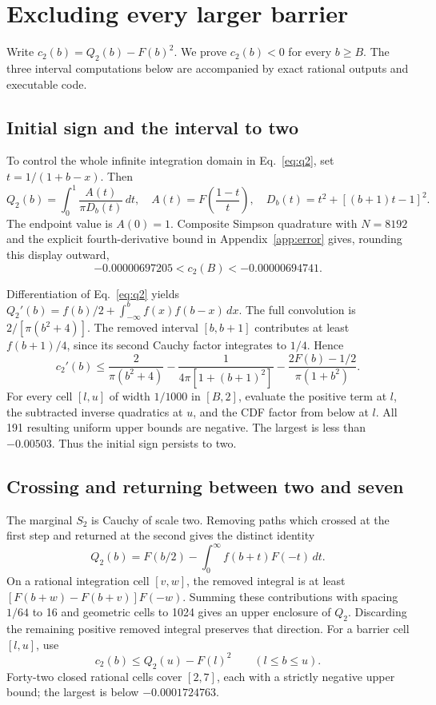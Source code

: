 \documentclass[11pt]{article}
\begin{document}
\section{Excluding every larger barrier}
Write $c_2(b)=Q_2(b)-F(b)^2$. We prove $c_2(b)<0$ for every $b\ge B$.
The three interval computations below are accompanied by exact rational
outputs and executable code.

\subsection{Initial sign and the interval to two}
To control the whole infinite integration domain in Eq.~\eqref{eq:q2}, set
$t=1/(1+b-x)$. Then
\begin{equation}\label{eq:compact}
 Q_2(b)=\int_0^1\frac{A(t)}{\pi D_b(t)}\,dt,\quad
 A(t)=F\left(\frac{1-t}{t}\right),\quad
 D_b(t)=t^2+[(b+1)t-1]^2.
\end{equation}
The endpoint value is $A(0)=1$. Composite Simpson quadrature with $N=8192$
and the explicit fourth-derivative bound in Appendix~\ref{app:error} gives,
rounding this display outward,
\begin{equation}
 -0.00000697205<c_2(B)<-0.00000694741.
\end{equation}

Differentiation of Eq.~\eqref{eq:q2} yields
$Q_2'(b)=f(b)/2+\int_{-\infty}^b f(x)f(b-x)\,dx$.
The full convolution is $2/[\pi(b^2+4)]$. The removed interval $[b,b+1]$
contributes at least $f(b+1)/4$, since its second Cauchy factor integrates
to $1/4$. Hence
\begin{equation}\label{eq:derivative}
 c_2'(b)\le\frac{2}{\pi(b^2+4)}
 -\frac{1}{4\pi[1+(b+1)^2]}
 -\frac{2F(b)-1/2}{\pi(1+b^2)}.
\end{equation}
For every cell $[l,u]$ of width $1/1000$ in $[B,2]$, evaluate the positive
term at $l$, the subtracted inverse quadratics at $u$, and the CDF factor
from below at $l$. All 191 resulting uniform upper bounds are negative.
The largest is less than $-0.00503$. Thus the initial sign persists to two.

\subsection{Crossing and returning between two and seven}
The marginal $S_2$ is Cauchy of scale two. Removing paths which crossed
at the first step and returned at the second gives the distinct identity
\begin{equation}\label{eq:return}
 Q_2(b)=F(b/2)-\int_0^\infty f(b+t)F(-t)\,dt.
\end{equation}
On a rational integration cell $[v,w]$, the removed integral is at least
$[F(b+w)-F(b+v)]F(-w)$. Summing these contributions with spacing $1/64$
to 16 and geometric cells to 1024 gives an upper enclosure of $Q_2$.
Discarding the remaining positive removed integral preserves that direction.
For a barrier cell $[l,u]$, use
\begin{equation}
 c_2(b)\le Q_2(u)-F(l)^2\qquad(l\le b\le u).
\end{equation}
Forty-two closed rational cells cover $[2,7]$, each with a strictly negative
upper bound; the largest is below $-0.0001724763$.
\end{document}
